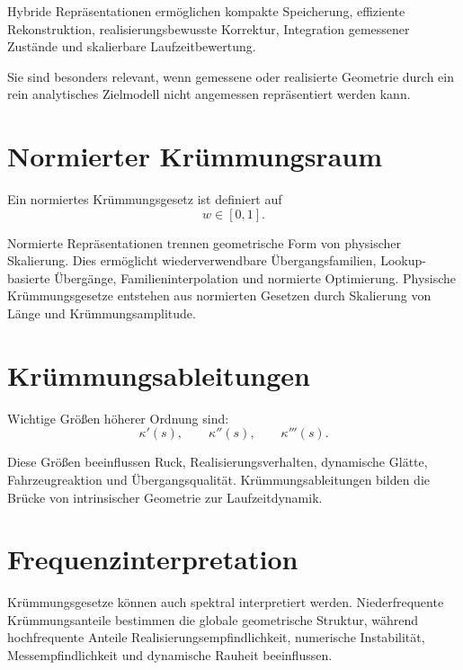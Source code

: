 Hybride Repräsentationen ermöglichen kompakte Speicherung, effiziente
Rekonstruktion, realisierungsbewusste Korrektur, Integration gemessener
Zustände und skalierbare Laufzeitbewertung.

Sie sind besonders relevant, wenn gemessene oder realisierte Geometrie durch
ein rein analytisches Zielmodell nicht angemessen repräsentiert werden kann.

\section{Normierter Krümmungsraum}

\begin{definition}
\label{def:normalized-curvature-law}
Ein normiertes Krümmungsgesetz ist definiert auf
\[
w\in[0,1].
\]
\end{definition}

Normierte Repräsentationen trennen geometrische Form von physischer
Skalierung. Dies ermöglicht wiederverwendbare Übergangsfamilien,
Lookup-basierte Übergänge, Familieninterpolation und normierte Optimierung.
Physische Krümmungsgesetze entstehen aus normierten Gesetzen durch Skalierung
von Länge und Krümmungsamplitude.

\section{Krümmungsableitungen}

\begin{definition}[Krümmungsableitungen]
\label{def:curvature-derivatives}
Wichtige Größen höherer Ordnung sind:
\[
\kappa'(s),\qquad \kappa''(s),\qquad \kappa'''(s).
\]
\end{definition}

Diese Größen beeinflussen Ruck, Realisierungsverhalten, dynamische Glätte,
Fahrzeugreaktion und Übergangsqualität. Krümmungsableitungen bilden die
Brücke von intrinsischer Geometrie zur Laufzeitdynamik.

\section{Frequenzinterpretation}

Krümmungsgesetze können auch spektral interpretiert werden. Niederfrequente
Krümmungsanteile bestimmen die globale geometrische Struktur, während
hochfrequente Anteile Realisierungsempfindlichkeit, numerische Instabilität,
Messempfindlichkeit und dynamische Rauheit beeinflussen.

